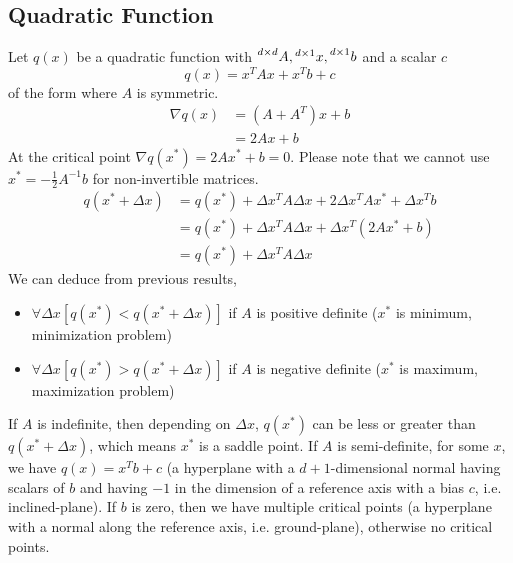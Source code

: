 \documentclass{book}
\numberwithin{equation}{subsection}
\begin{document}
\subsection{Quadratic Function}
Let $q(x)$ be a quadratic function with $\prescript{d \times d}{}{A}, \prescript{d \times 1}{}{x}, \prescript{d \times 1}{}{b}$ and a scalar $c$
\begin{equation}
    q(x) = x^TAx+x^Tb+c
\end{equation}
of the form where $A$ is symmetric.
\begin{align}
    \nabla q(x) &= (A+A^T)x+b\\
     &= 2Ax+b
\end{align}
At the critical point $\nabla q(x^*) = 2Ax^*+b = 0$. Please note that we cannot use $x^* = -\frac{1}{2}A^{-1}b$ for non-invertible matrices.
\begin{align}
    q(x^*+\Delta x) &= q(x^*) + \Delta x^TA\Delta x + 2\Delta x^TAx^* + \Delta x^Tb\\
    &= q(x^*) + \Delta x^TA\Delta x + \Delta x^T(2Ax^* + b)\\
    &= q(x^*) + \Delta x^TA\Delta x
\end{align}
We can deduce from previous results,
\begin{itemize}
    \item $\forall \Delta x [q(x^*) < q(x^*+\Delta x)]$ if $A$ is positive definite ($x^*$ is minimum, minimization problem)
    \item $\forall \Delta x [q(x^*) > q(x^*+\Delta x)]$ if $A$ is negative definite ($x^*$ is maximum, maximization problem)
    \label{posneg}
\end{itemize}
If $A$ is indefinite, then depending on $\Delta x$, $q(x^*)$ can be less or greater than $q(x^*+\Delta x)$, which means $x^*$ is a saddle point. If $A$ is semi-definite, for some $x$, we have $q(x) = x^Tb+c$ (a hyperplane with a $d+1$-dimensional normal having scalars of $b$ and having $-1$ in the dimension of a reference axis with a bias $c$, i.e. inclined-plane). If $b$ is zero, then we have multiple critical points (a hyperplane with a normal along the reference axis, i.e. ground-plane), otherwise no critical points.
\end{document}
